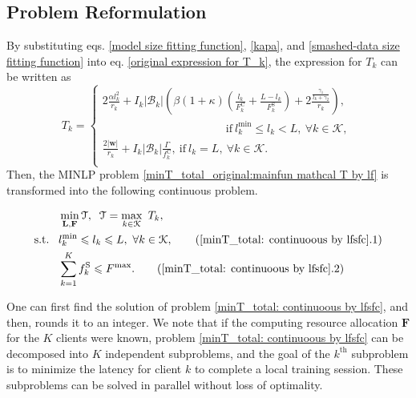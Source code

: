 \documentclass[10pt,journal,transmag]{IEEEtran}
\begin{document}
\subsection{Problem Reformulation}
By substituting eqs. \eqref{model size fitting function}, \eqref{kapa}, and \eqref{smashed-data size fitting function} into eq. \eqref{original expression for T_k}, the expression for $T_k$ can be written as
\begin{equation}
     T_k =  
    \begin{cases} 
        2\frac{\alpha l_k^2}{r_k} + I_k \left|\mathcal{B}_k\right| \left( \beta(1+\kappa)\left(\frac{ l_k }{F_k^\text{C}}+ \frac{  L - l_k  }{F_k^\text{S}} \right) + 2\frac{\frac{\gamma_1}{l_k+\gamma_2}}{r_k} \right), \\ 
        \quad \quad \quad \quad \quad \quad \quad \quad \quad \quad\quad \text{if}\ l_k^\text{min} \leqslant l_k < L,\ \forall k \in \mathcal{K},\   \\
        \displaystyle {\frac{2|\textbf{w}|}{r_k}+ I_k |\mathcal{B}_k| \frac{\Gamma}{f^\text{C}_k}},\ \text{if}\ l_k=L,\ \forall k \in \mathcal{K}.\\
    \end{cases}
    \label{fitted expression for T_k}
\end{equation}
Then, the MINLP problem \eqref{minT_total_original:mainfun mathcal T by lf} is transformed into the following continuous problem. 

\begin{align}
    & \min_{\textbf{L},\textbf{F}} \mathcal{T}, \; \;  \mathcal{T}=\max_{k\in\mathcal{K}}\ T_k,  \label{minT_total: continuoous by lfsfc} \\
    \mbox{s.t.}\;\;\;
    & l_k^\text{min} \leqslant l_k \leqslant L,\ \forall k \in \mathcal{K}, \tag{\ref{minT_total: continuoous by lfsfc}.1} \label{minT_total:subject l_m range} \\
    & \sum^{K}_{k=1} f^\text{S}_k \leqslant F^{\text{max}}.  \tag{\ref{minT_total: continuoous by lfsfc}.2} \label{minT_total:subject_f_max}
\end{align}

One can first find the solution of problem \eqref{minT_total: continuoous by lfsfc}, and then, rounds it to an integer.
We note that if the computing resource allocation $\textbf{F}$ for the $K$ clients were known, problem \eqref{minT_total: continuoous by lfsfc} can be decomposed into $K$ independent subproblems, and the goal of the $k^\text{th}$ subproblem is to minimize the latency for client $k$ to complete a local training session. These subproblems can be solved in parallel without loss of optimality.
\end{document}
